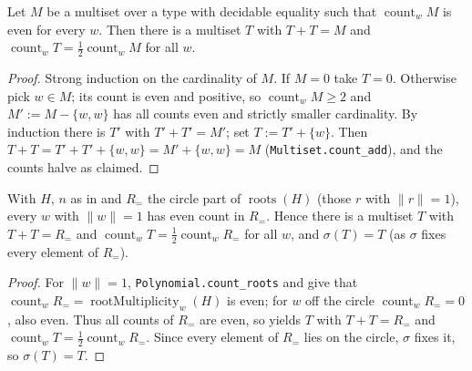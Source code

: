 \begin{lemma}
    \label{lem:exists-half-even-count}
    \leanok
    Let $M$ be a multiset over a type with decidable equality such that
    $\operatorname{count}_w M$ is even for every $w$. Then there is a multiset
    $T$ with $T + T = M$ and $\operatorname{count}_w T
    = \tfrac{1}{2}\operatorname{count}_w M$ for all $w$.
\end{lemma}
\begin{proof}
    Strong induction on the cardinality of $M$. If $M = 0$ take $T = 0$.
    Otherwise pick $w \in M$; its count is even and positive, so
    $\operatorname{count}_w M \ge 2$ and $M' := M - \{w, w\}$ has all counts even
    and strictly smaller cardinality. By induction there is $T'$ with
    $T' + T' = M'$; set $T := T' + \{w\}$. Then $T + T = T' + T' + \{w, w\}
    = M' + \{w, w\} = M$ (\texttt{Multiset.count\_add}), and the counts halve as
    claimed.
\end{proof}

\begin{lemma}
    \label{lem:fr-build-S-circle-half}
    \leanok
    With $H$, $n$ as in  and $R_{=}$ the circle part of
    $\operatorname{roots}(H)$ (those $r$ with $\|r\| = 1$), every $w$ with
    $\|w\| = 1$ has even count in $R_{=}$. Hence there is a multiset $T$ with
    $T + T = R_{=}$ and $\operatorname{count}_w T
    = \tfrac{1}{2}\operatorname{count}_w R_{=}$ for all $w$, and $\sigma(T) = T$
    (as $\sigma$ fixes every element of $R_{=}$).
\end{lemma}
\begin{proof}
    For $\|w\| = 1$, \texttt{Polynomial.count\_roots} and 
    give that $\operatorname{count}_w R_{=} = \operatorname{rootMultiplicity}_w(H)$
    is even; for $w$ off the circle $\operatorname{count}_w R_{=} = 0$, also even.
    Thus all counts of $R_{=}$ are even, so 
    yields $T$ with $T + T = R_{=}$ and $\operatorname{count}_w T
    = \tfrac{1}{2}\operatorname{count}_w R_{=}$. Since every element of $R_{=}$
    lies on the circle, $\sigma$ fixes it, so $\sigma(T) = T$.
\end{proof}

